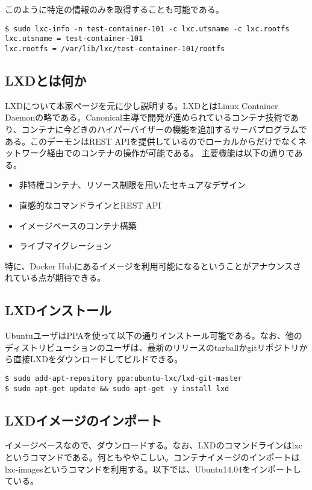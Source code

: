 \documentclass[9pt,b5paper,tombo]{jsbook}
\begin{document}
\noindent
このように特定の情報のみを取得することも可能である。

\begin{lstlisting}
$ sudo lxc-info -n test-container-101 -c lxc.utsname -c lxc.rootfs
lxc.utsname = test-container-101
lxc.rootfs = /var/lib/lxc/test-container-101/rootfs
\end{lstlisting}


\subsection{LXDとは何か}
LXDについて本家ページを元に少し説明する。LXDとはLinux Container Daemonの略である。Canonical主導で開発が進められているコンテナ技術であり、コンテナに今どきのハイパーバイザーの機能を追加するサーバプログラムである。このデーモンはREST APIを提供しているのでローカルからだけでなくネットワーク経由でのコンテナの操作が可能である。
\noindent
主要機能は以下の通りである。
\begin{itemize}
  \item 非特権コンテナ、リソース制限を用いたセキュアなデザイン
  \item 直感的なコマンドラインとREST API
  \item イメージベースのコンテナ構築
  \item ライブマイグレーション
\end{itemize}

\noindent
特に、Docker Hubにあるイメージを利用可能になるということがアナウンスされている点が期待できる。


\subsection{LXDインストール}
UbuntuユーザはPPAを使って以下の通りインストール可能である。なお、他のディストリビューションのユーザは、最新のリリースのtarballかgitリポジトリから直接LXDをダウンロードしてビルドできる。
\begin{lstlisting}
$ sudo add-apt-repository ppa:ubuntu-lxc/lxd-git-master
$ sudo apt-get update && sudo apt-get -y install lxd
\end{lstlisting}

\subsection{LXDイメージのインポート}
イメージベースなので、ダウンロードする。なお、LXDのコマンドラインはlxcというコマンドである。何ともややこしい。コンテナイメージのインポートはlxc-imagesというコマンドを利用する。以下では、Ubuntu14.04をインポートしている。
\end{document}
